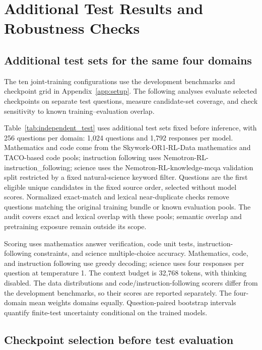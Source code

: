 \section{Additional Test Results and Robustness Checks}
\label{app:completed_results}

\subsection{Additional test sets for the same four domains}
\label{app:independent_domain_test}

The ten joint-training configurations use the development benchmarks and checkpoint grid in Appendix~\ref{app:setup}. The following analyses evaluate selected checkpoints on separate test questions, measure candidate-set coverage, and check sensitivity to known training--evaluation overlap.

Table~\ref{tab:independent_test} uses additional test sets fixed before inference, with 256 questions per domain: 1,024 questions and 1,792 responses per model. Mathematics and code come from the Skywork-OR1-RL-Data mathematics and TACO-based code pools; instruction following uses Nemotron-RL-instruction\_following; science uses the Nemotron-RL-knowledge-mcqa validation split restricted by a fixed natural-science keyword filter. Questions are the first eligible unique candidates in the fixed source order, selected without model scores. Normalized exact-match and lexical near-duplicate checks remove questions matching the original training bundle or known evaluation pools. The audit covers exact and lexical overlap with these pools; semantic overlap and pretraining exposure remain outside its scope.

Scoring uses mathematics answer verification, code unit tests, instruction-following constraints, and science multiple-choice accuracy. Mathematics, code, and instruction following use greedy decoding; science uses four responses per question at temperature 1. The context budget is 32,768 tokens, with thinking disabled. The data distributions and code/instruction-following scorers differ from the development benchmarks, so their scores are reported separately. The four-domain mean weights domains equally. Question-paired bootstrap intervals quantify finite-test uncertainty conditional on the trained models.



\subsection{Checkpoint selection before test evaluation}
\label{app:completed_selection}

